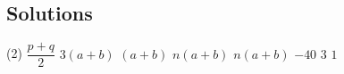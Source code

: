 \subsection*{Solutions}
\begin{tasks}[label = \arabic*.,label-width = 1.5em](2) %
    \task $\dfrac{p+q}{2}$
    \task $3(a+b)$
    \task $(a+b)$
    \task $n(a+b)$
    \task $n(a+b)$
    \task $-40$
    \task $3$
    \task $1$
\end{tasks}